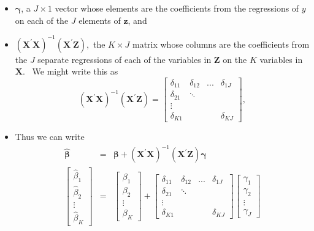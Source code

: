 \documentclass[11pt]{article}
\begin{document}
\begin{itemize}
\item $\mathbf{\gamma }$, a $J\times 1$ vector whose elements are the
coefficients from the regressions of $y$ on each of the $J$ elements of $%
\mathbf{z}$, and

\item $\left( \mathbf{X}^{\prime }\mathbf{X}\right) ^{-1}\left( \mathbf{X}%
^{\prime }\mathbf{Z}\right) ,$ the $K\times J$ matrix whose columns are the
coefficients from the $J$ separate regressions of each of the variables in $%
\mathbf{Z}$ on the $K$ variables in $\mathbf{X}$. \ We might write this as%
\begin{equation*}
\left( \mathbf{X}^{\prime }\mathbf{X}\right) ^{-1}\left( \mathbf{X}^{\prime }%
\mathbf{Z}\right) =%
\begin{bmatrix}
\delta _{11} & \delta _{12} & ... & \delta _{1J} \\ 
\delta _{21} & \ddots  &  &  \\ 
\vdots  &  &  &  \\ 
\delta _{K1} &  &  & \delta _{KJ}%
\end{bmatrix}%
,
\end{equation*}

\item Thus we can write%
\begin{eqnarray*}
\widehat{\mathbf{\beta }} &=&\mathbf{\mathbf{\beta +}}\left( \mathbf{X}%
^{\prime }\mathbf{X}\right) ^{-1}\left( \mathbf{X}^{\prime }\mathbf{Z}%
\right) \mathbf{\gamma } \\
\begin{bmatrix}
\widehat{\beta }_{1} \\ 
\widehat{\beta }_{2} \\ 
\vdots  \\ 
\widehat{\beta }_{K}%
\end{bmatrix}
&=&%
\begin{bmatrix}
\beta _{1} \\ 
\beta _{2} \\ 
\vdots  \\ 
\beta _{K}%
\end{bmatrix}%
+%
\begin{bmatrix}
\delta _{11} & \delta _{12} & ... & \delta _{1J} \\ 
\delta _{21} & \ddots  &  &  \\ 
\vdots  &  &  &  \\ 
\delta _{K1} &  &  & \delta _{KJ}%
\end{bmatrix}%
\begin{bmatrix}
\gamma _{1} \\ 
\gamma _{2} \\ 
\vdots  \\ 
\gamma _{J}%
\end{bmatrix}%
\end{eqnarray*}


\end{itemize}
\end{document}
